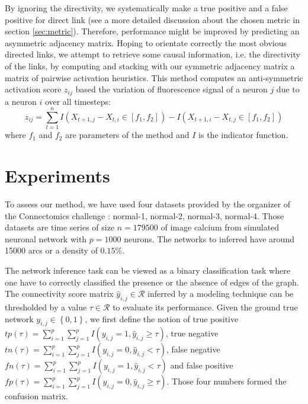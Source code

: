 \documentclass[wcp]{jmlr}
\begin{document}
By ignoring the directivity, we systematically
make a true positive and a false positive for direct link (see a more detailed
discussion about the chosen metric in section \ref{sec:metric}). Therefore,
performance might be improved by predicting an asymmetric adjacency matrix.
Hoping to orientate correctly the most obvious directed links, we attempt to
retrieve some causal information, i.e. the directivity of the links, by computing
and stacking with our symmetric adjacency matrix a matrix of pairwise activation
heuristics. This method computes an anti-symmetric activation score $z_{ij}$
based the variation of fluorescence signal of a neuron $j$ due to a neuron $i$
over all timesteps:
\[
z_{ij} = \sum_{t=1}^n I(X_{t+1,j} - X_{t, i} \in [f_1, f_2]) -  I(X_{t+1,i} - X_{t, j} \in [f_1, f_2])
\]
where $f_1$ and $f_2$ are parameters of the method and $I$ is the
indicator function. %


\section{Experiments}
To assess our method, we have used four datasets provided by the organizer
of the Connectomics challenge : normal-1, normal-2, normal-3, normal-4. Those
datasets are time series of size $n=179500$ of image calcium from simulated
neuronal network \cite{stetter2012model} with $p=1000$ neurons. The networks
to inferred have around 15000 arcs or a density of $0.15\%$.

The network inference task can be viewed as a binary classification task
where one have to correctly classified the presence or the absence of edges
of the graph. The connectivity score matrix
$\hat{y}_{i,j} \in \mathcal{R}$ inferred by a modeling technique
can be thresholded by a value $\tau \in \mathcal{R}$ to evaluate its performance.
Given the ground true network $y_{i,j} \in \left\{0, 1\right\}$, we first define the notion of
true positive $tp(\tau) = \sum_{i=1}^p \sum_{j=1}^p I(y_{i,j} = 1, \hat{y}_{i,j} \geq \tau)$,
true negative $tn(\tau) = \sum_{i=1}^p \sum_{j=1}^p I(y_{i,j} = 0, \hat{y}_{i,j} < \tau)$,
false negative $fn(\tau) = \sum_{i=1}^p \sum_{j=1}^p I(y_{i,j} = 1, \hat{y}_{i,j} < \tau)$ and
false positive $fp(\tau) = \sum_{i=1}^p \sum_{j=1}^p I(y_{i,j} = 0, \hat{y}_{i,j} \geq \tau)$.
Those four numbers formed the confusion matrix.
\end{document}

